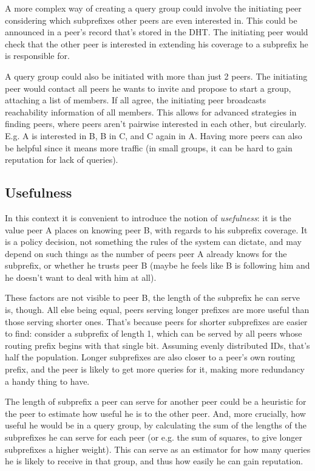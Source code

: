 A more complex way of creating a query group could involve the initiating peer
considering which subprefixes other peers are even interested in. This could be
announced in a peer's record that's stored in the DHT. The initiating peer would
check that the other peer is interested in extending his coverage to a subprefix
he is responsible for.

A query group could also be initiated with more than just 2 peers. The
initiating peer would contact all peers he wants to invite and propose to start
a group, attaching a list of members. If all agree, the initiating peer
broadcasts reachability information of all members. This allows for advanced
strategies in finding peers, where peers aren't pairwise interested in each
other, but circularly. E.g. A is interested in B, B in C, and C again in A.
Having more peers can also be helpful since it means more traffic (in small
groups, it can be hard to gain reputation for lack of queries).

\subsection{Usefulness}
\label{sec:desc_usefulness}
In this context it is convenient to introduce the notion of \emph{usefulness}:
it is the value peer A places on knowing peer B, with regards to his subprefix
coverage. It is a policy decision, not something the rules of the system can
dictate, and may depend on such things as the number of peers peer A already
knows for the subprefix, or whether he trusts peer B (maybe he feels like B is
following him and he doesn't want to deal with him at all).

These factors are not visible to peer B, the length of the subprefix he can
serve is, though. All else being equal, peers serving longer prefixes are more
useful than those serving shorter ones. That's because peers for shorter
subprefixes are easier to find: consider a subprefix of length 1, which can be
served by all peers whose routing prefix begins with that single bit. Assuming
evenly distributed IDs, that's half the population. Longer subprefixes are also
closer to a peer's own routing prefix, and the peer is likely to get more
queries for it, making more redundancy a handy thing to have.

The length of subprefix a peer can serve for another peer could be a heuristic
for the peer to estimate how useful he is to the other peer. And, more
crucially, how useful he would be in a query group, by calculating the sum of
the lengths of the subprefixes he can serve for each peer (or e.g. the sum of
squares, to give longer subprefixes a higher weight). This can serve as an
estimator for how many queries he is likely to receive in that group, and thus
how easily he can gain reputation.

